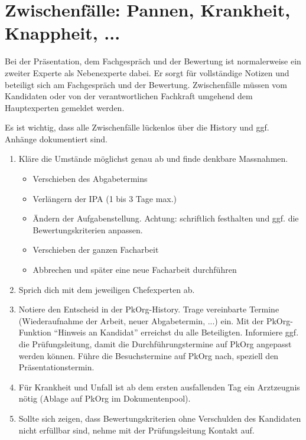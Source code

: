 \section{Zwischenfälle: Pannen, Krankheit, Knappheit, ...}
Bei der Präsentation, dem Fachgespräch und der Bewertung ist normalerweise ein zweiter Experte als Nebenexperte dabei. Er sorgt für vollständige Notizen und beteiligt sich am Fachgespräch und der Bewertung. Zwischenfälle müssen vom Kandidaten oder von der verantwortlichen Fachkraft umgehend dem Hauptexperten gemeldet werden.

Es ist wichtig, dass alle Zwischenfälle lückenlos über die History und ggf. Anhänge dokumentiert sind.

\begin{enumerate}
  \item Kläre die Umstände möglichst genau ab und finde denkbare Massnahmen.
  \begin{itemize}
    \item Verschieben des Abgabetermins
    \item Verlängern der IPA (1 bis 3 Tage max.)
    \item Ändern der Aufgabenstellung. Achtung: schriftlich festhalten und ggf. die Bewertungskriterien anpassen.
    \item Verschieben der ganzen Facharbeit
    \item Abbrechen und später eine neue Facharbeit durchführen
  \end{itemize}
  \item Sprich dich mit dem jeweiligen Chefexperten ab.
  \item Notiere den Entscheid in der PkOrg-History. Trage vereinbarte Termine (Wiederaufnahme der Arbeit, neuer Abgabetermin, ...) ein. Mit der PkOrg-Funktion \enquote{Hinweis an Kandidat} erreichst du alle Beteiligten.
  Informiere ggf. die Prüfungsleitung, damit die Durchführungstermine auf PkOrg
  angepasst werden können. Führe die Besuchstermine auf PkOrg nach, speziell den Präsentationstermin.
  \item Für Krankheit und Unfall ist ab dem ersten ausfallenden Tag ein Arztzeugnis nötig (Ablage auf PkOrg im Dokumentenpool).
  \item Sollte sich zeigen, dass Bewertungskriterien ohne Verschulden des Kandidaten nicht erfüllbar sind, nehme mit der Prüfungsleitung Kontakt auf.
\end{enumerate}

